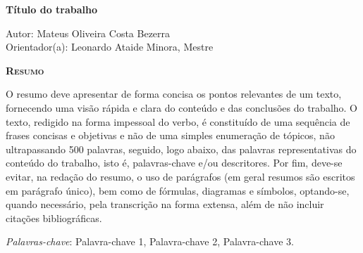 \begin{center}
	{\Large{\textbf{Título do trabalho}}}
\end{center}

\vspace{1cm}

\begin{flushright}
  Autor: Mateus Oliveira Costa Bezerra\\
  Orientador(a): Leonardo Ataide Minora, Mestre
\end{flushright}

\vspace{1cm}

\begin{center}
	\Large{\textsc{\textbf{Resumo}}}
\end{center}

\noindent O resumo deve apresentar de forma concisa os pontos relevantes de um
texto, fornecendo uma visão rápida e clara do conteúdo e das conclusões do
trabalho. O texto, redigido na forma impessoal do verbo, é constituído de uma
sequência de frases concisas e objetivas e não de uma simples enumeração de
tópicos, não ultrapassando 500 palavras, seguido, logo abaixo, das palavras
representativas do conteúdo do trabalho, isto é, palavras-chave e/ou
descritores. Por fim, deve-se evitar, na redação do resumo, o uso de parágrafos
(em geral resumos são escritos em parágrafo único), bem como de fórmulas,
diagramas e símbolos, optando-se, quando necessário, pela transcrição na forma
extensa, além de não incluir citações bibliográficas.

\noindent\textit{Palavras-chave}: Palavra-chave 1, Palavra-chave 2, Palavra-chave 3.

